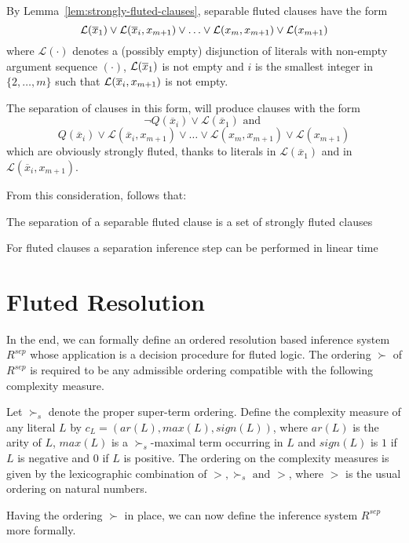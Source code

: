 By Lemma~\ref{lem:strongly-fluted-clauses}, separable fluted clauses have the form
\begin{equation}\label{eq:separable-fluted-clauses}
  \mathcal{L}(\overline{x}_1)\lor \mathcal{L}\flseq[x]{i}[x_{m+1}] \lor \ldots \lor \mathcal{L}(x_m, x_{m+1}) \lor \mathcal{L}(x_{m+1})
\end{equation}
where \(\mathcal{L}(\cdot)\) denotes a (possibly empty) disjunction of literals with non-empty argument sequence \((\cdot)\), \(\mathcal{L}\flseq[x]{1}\) is not empty and \(i\) is the smallest integer in \(\{2,\ldots, m\}\) such that \(\mathcal{L}\flseq[x]{i}[x_{m+1}]\) is not empty.

The separation of clauses in this form, will produce clauses with the form
\[
  \neg Q(\overline{x}_i) \lor \mathcal{L}(\overline{x}_1) \text{ and }
\]
\[
  Q(\overline{x}_i) \lor \mathcal{L}(\overline{x}_i,x_{m+1}) \lor \ldots \lor \mathcal{L}(x_m, x_{m+1}) \lor \mathcal{L}(x_{m+1})
\]
which are obviously strongly fluted, thanks to literals in \(\mathcal{L}(\overline{x}_1)\) and in \(\mathcal{L}(\overline{x}_i,x_{m+1})\).

From this consideration, follows that:
\begin{lemma}\label{lem:separation-fluted}
  The separation of a separable fluted clause is a set of strongly fluted clauses
\end{lemma}
\begin{lemma}
  For fluted clauses a separation inference step can be performed in linear time
\end{lemma}


\section{Fluted Resolution}\label{sec:fluted-resolution}

In the end, we can formally define an ordered resolution based inference system \(R^{sep}\) whose application is a decision procedure for fluted logic.
The ordering \(\succ\) of \(R^{sep}\) is required to be any admissible ordering compatible with the following complexity measure.

\begin{definition}
  Let \(\succ_s\) denote the proper super-term ordering. Define the complexity measure of any literal \(L\) by \(c_L = (ar(L),max(L),sign(L))\), where \(ar(L)\) is the arity of \(L\), \(max(L)\) is a \(\succ_s\)-maximal term occurring in \(L\) and \(sign(L)\) is \(1\) if \(L\) is negative and \(0\) if \(L\) is positive. %
  The ordering on the complexity measures is given by the lexicographic combination of \(>,\succ_s \text{ and } >\), where \(>\) is the usual ordering on natural numbers.
\end{definition}
Having the ordering \(\succ\) in place, we can now define the inference system \(R^{sep}\) more formally.

